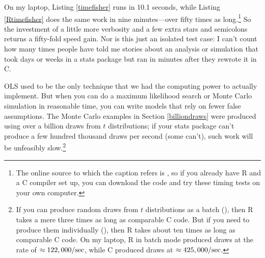 On my laptop, Listing \ref{timefisher} runs in
10.1 seconds, while Listing \ref{Rtimefisher} does the same work in nine
minutes---over fifty times as long.\footnote{The online source to which
the caption refers is \samplecodelocation, so if you already have R and
a C compiler set up, you can download the code and try these timing
tests on your own computer.} So the investment of a little more
verbosity and a few extra stars and semicolons returns a fifty-fold
speed gain. Nor is this just an isolated test case: I can't count how
many times people have told me stories about an analysis or simulation
that took days or weeks in a stats package but ran in minutes after they
rewrote it in C.

OLS used to be the only technique that we had the computing power to
actually implement. But when you can do a maximum likelihood search
or Monte Carlo simulation in reasonable time, you can write models
that rely on fewer false assumptions. The Monte Carlo examples in Section
\ref{billiondraws} were produced using over a billion draws from $t$
distributions; if your stats package can't produce a few hundred thousand 
draws per second (some can't), such work will be unfeasibly
slow.\footnote{If you can produce random draws from $t$ distributions
as a batch (), then R takes a mere three
times as long as comparable C code. But if you need to produce them
individually (), then R 
takes about ten times as long as comparable C code. On my laptop, R in
batch mode produced draws at the rate of $\approx 122,000/{\rm sec}$,
while C produced draws at $\approx 425,000/{\rm sec}$.}

